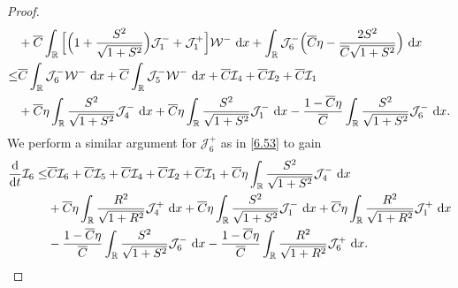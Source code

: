 \documentclass[11pt,reqno]{article}
\newcommand{\fr}{\frac}
\numberwithin{equation}{section}
\begin{document}
\begin{proof}
\begin{align}
\begin{split}
&+\overline{C}\int_{\mathbb{R}}  \Big[\Big(1+\fr{S^2}{\sqrt{1+S^2}}\Big)\mathcal{J}_{1}^-+\mathcal{J}_{1}^+\Big] \mathcal{W}^-\ {\rm d}x  +\int_{\mathbb{R}}\mathcal{J}_{6}^- \Big(\overline{C}\eta-\fr{2S^2}{\overline{C}\sqrt{1+S^2}}\Big)\ {\rm d}x \\
\leq & \overline{C}\int_{\mathbb{R}}\mathcal{J}_{6}^-\mathcal{W}^-\ {\rm d}x +\overline{C}\int_{\mathbb{R}} \mathcal{J}_{5}^- \mathcal{W}^-\ {\rm d}x + \overline{C} \mathcal{I}_4 +\overline{C} \mathcal{I}_2 +\overline{C} \mathcal{I}_1 \\
&+ \overline{C}\eta\int_{\mathbb{R}} \fr{S^2}{\sqrt{1+S^2}} \mathcal{J}_{4}^-\ {\rm d}x  + \overline{C}\eta\int_{\mathbb{R}} \fr{S^2}{\sqrt{1+S^2}} \mathcal{J}_{1}^-\ {\rm d}x -\fr{1-\overline{C}\eta}{\overline{C}}\int_{\mathbb{R}} \fr{S^2}{\sqrt{1+S^2}}\mathcal{J}_{6}^- \ {\rm d}x.
\end{split}
\end{align}
We perform a similar argument for $\mathcal{J}_{6}^+$ as in \eqref{6.53} to gain
\begin{align}\label{6.54}
\begin{split}
\fr{{\rm d}}{{\rm d}t}\mathcal{I}_6
\leq & \overline{C}\mathcal{I}_6 +\overline{C}\mathcal{I}_5 + \overline{C} \mathcal{I}_4 +\overline{C} \mathcal{I}_2 +\overline{C} \mathcal{I}_1+ \overline{C}\eta\int_{\mathbb{R}} \fr{S^2}{\sqrt{1+S^2}} \mathcal{J}_{4}^-\ {\rm d}x \\
&+ \overline{C}\eta\int_{\mathbb{R}} \fr{R^2}{\sqrt{1+R^2}} \mathcal{J}_{4}^+\ {\rm d}x+ \overline{C}\eta\int_{\mathbb{R}} \fr{S^2}{\sqrt{1+S^2}} \mathcal{J}_{1}^-\ {\rm d}x + \overline{C}\eta\int_{\mathbb{R}} \fr{R^2}{\sqrt{1+R^2}} \mathcal{J}_{1}^+\ {\rm d}x \\ & -\fr{1-\overline{C}\eta}{\overline{C}}\int_{\mathbb{R}} \fr{S^2}{\sqrt{1+S^2}}\mathcal{J}_{6}^- \ {\rm d}x -\fr{1-\overline{C}\eta}{\overline{C}}\int_{\mathbb{R}} \fr{R^2}{\sqrt{1+R^2}}\mathcal{J}_{6}^+ \ {\rm d}x.
\end{split}
\end{align}



\end{proof}
\end{document}
